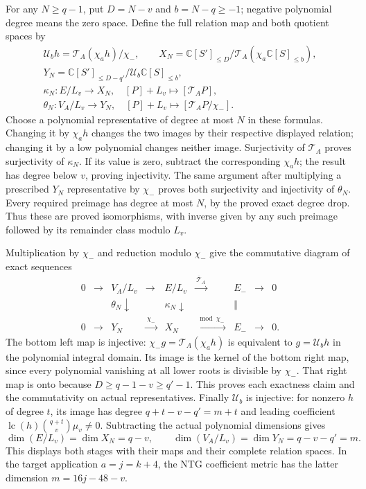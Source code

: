 For any $N\ge q-1$, put $D=N-v$ and $b=N-q\ge-1$; negative
polynomial degree means the zero space. Define the full relation map
and both quotient spaces by
\[
\begin{gathered}
 \mathcal U_b h=\mathcal T_A(\chi_a h)/\chi_-,\qquad
 X_N=\mathbb C[S']_{\le D}/
                \mathcal T_A(\chi_a\mathbb C[S]_{\le b}),\\
 Y_N=\mathbb C[S']_{\le D-q'}/
                \mathcal U_b\mathbb C[S]_{\le b},\\
 \kappa_N:E/L_v\longrightarrow X_N,\quad
    [P]+L_v\longmapsto[\mathcal T_AP],\\
 \theta_N:V_A/L_v\longrightarrow Y_N,\quad
    [P]+L_v\longmapsto[\mathcal T_AP/\chi_-].
\end{gathered}\tag{TAC1d}
\]
Choose a polynomial representative of degree at most $N$ in these
formulas. Changing it by $\chi_a h$ changes the two images by their
respective displayed relation; changing it by a low polynomial changes
neither image. Surjectivity of $\mathcal T_A$ proves surjectivity of
$\kappa_N$. If its value is zero, subtract the corresponding
$\chi_a h$; the result has degree below $v$, proving injectivity.
The same argument after multiplying a prescribed $Y_N$ representative
by $\chi_-$ proves both surjectivity and injectivity of $\theta_N$.
Every required preimage has degree at most $N$, by the proved exact
degree drop. Thus these are proved isomorphisms, with inverse given by
any such preimage followed by its remainder class modulo $L_v$.

Multiplication by $\chi_-$ and reduction modulo $\chi_-$ give the
commutative diagram of exact sequences
\[
\begin{array}{ccccccccc}
0&\longrightarrow&V_A/L_v&\longrightarrow&E/L_v
 &\xrightarrow{\ \overline{\mathcal T}_A\ }&E_-&\longrightarrow&0\\
 &&\theta_N\downarrow&&\kappa_N\downarrow&&\Vert\\
0&\longrightarrow&Y_N&\xrightarrow{\ \chi_-\ }&X_N
 &\xrightarrow{\ \bmod\chi_-\ }&E_-&\longrightarrow&0 .
\end{array}\tag{TAC1e}
\]
The bottom left map is injective: $\chi_-g=\mathcal T_A(\chi_a h)$
is equivalent to $g=\mathcal U_bh$ in the polynomial integral domain.
Its image is the kernel of the bottom right map, since every polynomial
vanishing at all lower roots is divisible by $\chi_-$. That right map
is onto because $D\ge q-1-v\ge q'-1$. This proves each exactness
claim and the commutativity on actual representatives.
Finally $\mathcal U_b$ is injective: for nonzero $h$ of degree $t$,
its image has degree $q+t-v-q'=m+t$ and leading coefficient
$\operatorname{lc}(h)\binom{q+t}{v}\mu_v\ne0$.
Subtracting the actual polynomial dimensions gives
\[
 \dim(E/L_v)=\dim X_N=q-v,
 \qquad \dim(V_A/L_v)=\dim Y_N=q-v-q'=m.
 \tag{TAC1f}
\]
This displays both stages with their maps and their complete relation
spaces. In the target application $a=j=k+4$, the NTG coefficient
metric has the latter dimension $m=16j-48-v$.

